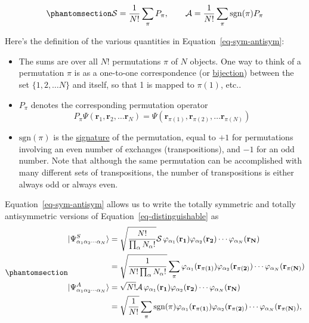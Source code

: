 \documentclass[
  a4paper,
]{scrbook}
\providecommand{\tightlist}{%
  \setlength{\itemsep}{0pt}\setlength{\parskip}{0pt}}\usepackage{longtable,booktabs,array}
\begin{document}
\begin{equation}\phantomsection\label{eq-sym-antisym}{
\mathcal{S}=\frac{1}{N!}\sum_{\pi} P_\pi, \qquad \mathcal{A}=\frac{1}{N!}\sum_{\pi} \mathrm{sgn}(\pi)P_\pi
}\end{equation}

Here's the definition of the various quantities in
Equation~\ref{eq-sym-antisym}:

\begin{itemize}
\tightlist
\item
  The sums are over all \(N!\) permutations \(\pi\) of \(N\) objects.
  One way to think of a permutation \(\pi\) is as a one-to-one
  correspondence (or
  \href{https://en.wikipedia.org/wiki/Bijection}{bijection}) between the
  set \(\{1,2,\ldots N\}\) and itself, so that 1 is mapped to
  \(\pi(1)\), etc..
\item
  \(P_\pi\) denotes the corresponding permutation operator \[
  P_\pi \Psi(\mathbf{r}_1,\mathbf{r}_2,\ldots \mathbf{r}_N) = \Psi(\mathbf{r}_{\pi(1)}, \mathbf{r}_{\pi(2)},\ldots \mathbf{r}_{\pi(N)})
  \]
\item
  \(\mathrm{sgn}(\pi)\) is the
  \href{https://en.wikipedia.org/wiki/Parity_of_a_permutation}{signature}
  of the permutation, equal to \(+1\) for permutations involving an even
  number of exchanges (transpositions), and \(-1\) for an odd number.
  Note that although the same permutation can be accomplished with many
  different sets of transpositions, the number of transpositions is
  either always odd or always even.
\end{itemize}

Equation~\ref{eq-sym-antisym} allows us to write the totally symmetric
and totally antisymmetric versions of Equation~\ref{eq-distinguishable}
as \begin{equation}\phantomsection\label{eq-norm}{
\begin{aligned}
 \lvert{\Psi^{S}_{\alpha_{1}\alpha_{2}\cdots\alpha_{N}}}\rangle&=\sqrt{\frac{N!}{\prod_{\alpha}N_{\alpha}!}}\mathcal{S}\,\varphi_{\alpha_{1}}(\mathbf{r_{1}})\varphi_{\alpha_{2}}(\mathbf{r_{2}})\cdots\varphi_{\alpha_{N}}(\mathbf{r_{N}}) \\
&=\sqrt{\frac{1}{N!\prod_{\alpha}N_{\alpha}!}}\sum_\pi\varphi_{\alpha_{1}}(\mathbf{r_{\pi(1)}})\varphi_{\alpha_{2}}(\mathbf{r_{\pi(2)}})\cdots\varphi_{\alpha_{N}}(\mathbf{r_{\pi(N)}})\\
 \lvert{\Psi^{A}_{\alpha_{1}\alpha_{2}\cdots\alpha_{N}}}\rangle&=\sqrt{N!}\mathcal{A}\,\varphi_{\alpha_{1}}(\mathbf{r_{1}})\varphi_{\alpha_{2}}(\mathbf{r_{2}})\cdots\varphi_{\alpha_{N}}(\mathbf{r_{N}})\\
 &=\sqrt{\frac{1}{N!}}\sum_\pi \mathrm{sgn}(\pi)\varphi_{\alpha_{1}}(\mathbf{r_{\pi(1)}})\varphi_{\alpha_{2}}(\mathbf{r_{\pi(2)}})\cdots\varphi_{\alpha_{N}}(\mathbf{r_{\pi(N)}}),
\end{aligned}
}\end{equation}
\end{document}
